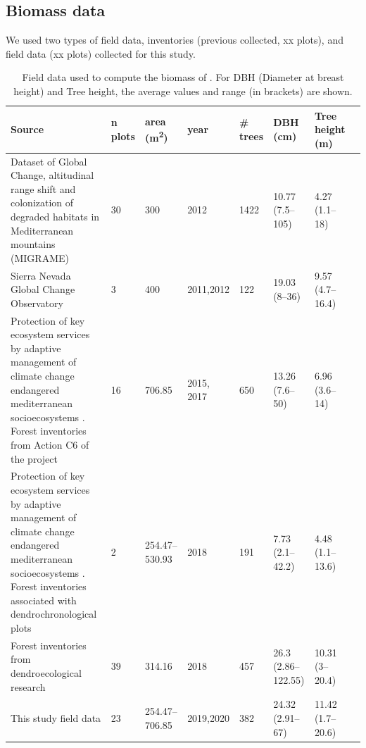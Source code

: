 \subsection{Biomass data}\label{sec:carbon:mat-field-data}

We used two types of field data, inventories (previous collected, xx plots), and field data (xx plots) collected for this study. 

\begin{table} 
\caption{Field data used to compute the biomass of \Qp. For DBH (Diameter at breast height) and Tree height, the average values and range (in brackets) are shown.}\label{tab:carbon:inventories}
\begin{adjustbox}{width=\linewidth}
	\begin{threeparttable}
		\begin{tabular}{p{10cm}lllllll}
		\toprule[0.5pt]
		\textbf{Source} & \textbf{n plots} & \textbf{area (m\textsuperscript{2})} & \textbf{year} & \textbf{\# trees} & \textbf{DBH (cm)} & \textbf{Tree height (m)} \\ \toprule 
		Dataset of Global Change, altitudinal range shift and colonization of degraded habitats in Mediterranean mountains (MIGRAME) \autocite{PerezLuqueetal2015DatasetMIGRAME} & 30 & 300 & 2012 & 1422 & 10.77 (7.5--105) & 4.27 (1.1--18) \\ \midrule
		Sierra Nevada Global Change Observatory \autocites{Aspizuaetal2014EvaluacionGestion,Zamoraetal2017GlobalChange} & 3 & 400 & 2011,2012 & 122 & 19.03 (8--36) & 9.57 (4.7--16.4) \\ \midrule
		Protection of key ecosystem services by adaptive management of climate change endangered mediterranean socioecosystems \autocite{BareaAzconetal2017LIFEADAPTAMED}. Forest inventories from Action C6 of the project & 16 & 706.85 & 2015, 2017 & 650 & 13.26 (7.6--50) & 6.96 (3.6--14) \\ \midrule
		Protection of key ecosystem services by adaptive management of climate change endangered mediterranean socioecosystems \autocite{BareaAzconetal2017LIFEADAPTAMED}. Forest inventories associated with dendrochronological plots & 2 & 254.47--530.93 & 2018 & 191 & 7.73 (2.1--42.2) & 4.48 (1.1--13.6) \\ \midrule
		Forest inventories from dendroecological research \autocite[see chapter \ref{sec:dendro};][]{PerezLuqueetal2020LanduseLegacies} & 39 & 314.16 & 2018 & 457 & 26.3 (2.86--122.55) & 10.31 (3--20.4) \\ \midrule
		This study field data & 23 & 254.47--706.85 & 2019,2020 & 382 & 24.32 (2.91--67) & 11.42 (1.7--20.6) \\ \bottomrule
		\end{tabular}
	\end{threeparttable}
\end{adjustbox}
\end{table}

